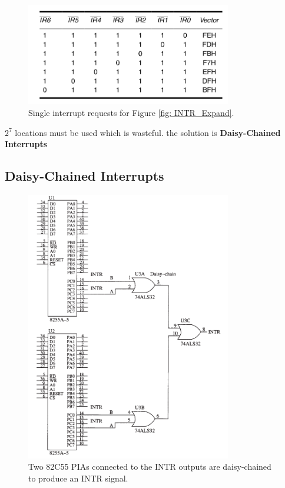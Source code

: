 \begin{figure}[h!]
  \includegraphics[width = 0.8\textwidth]{./figures/INTR_Table.png}
  \caption{Single interrupt requests for Figure \ref{fig: INTR_Expand}.}

\end{figure}

$2^7$ locations must be used which is wasteful. the solution is \textbf{Daisy-Chained Interrupts}

\subsection{Daisy-Chained Interrupts}
\begin{figure}[h!]
  \includegraphics[width = 0.8\textwidth]{./figures/Daisy_Chain.png}
  \caption{Two 82C55 PIAs connected to the INTR outputs are daisy-chained to produce an INTR signal.}
  \label{fig: Daisy_Chain}
\end{figure}

